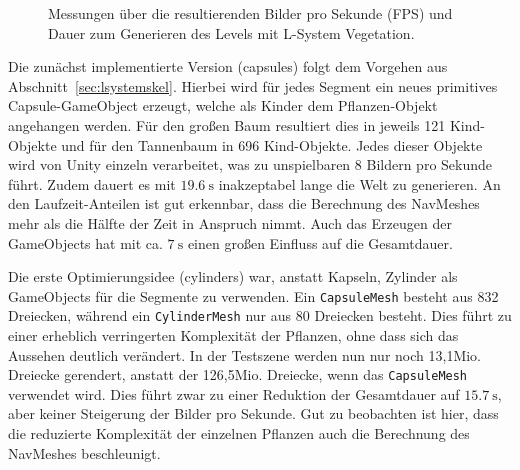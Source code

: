 \begin{figure}[ht]
    \caption[Messung von Vegetationsoptimierungen]{Messungen über die resultierenden Bilder pro Sekunde (FPS) und Dauer zum Generieren des Levels mit L-System Vegetation.}\label{fig:WG::Vegetation}
\end{figure}

Die zunächst implementierte Version (capsules) folgt dem Vorgehen aus Abschnitt~\ref{sec:lsystemskel}.
Hierbei wird für jedes Segment ein neues primitives Capsule-GameObject erzeugt, welche als Kinder dem Pflanzen-Objekt angehangen werden.
Für den großen Baum resultiert dies in jeweils 121 Kind-Objekte und für den Tannenbaum in 696 Kind-Objekte.
Jedes dieser Objekte wird von Unity einzeln verarbeitet, was zu unspielbaren 8 Bildern pro Sekunde führt.
Zudem dauert es mit $\SI{19.6}{\second}$ inakzeptabel lange die Welt zu generieren.
An den Laufzeit-Anteilen ist gut erkennbar, dass die Berechnung des NavMeshes mehr als die Hälfte der Zeit in Anspruch nimmt.
Auch das Erzeugen der GameObjects hat mit ca. $\SI{7}{\second}$ einen großen Einfluss auf die Gesamtdauer.

Die erste Optimierungsidee (cylinders) war, anstatt Kapseln, Zylinder als GameObjects für die Segmente zu verwenden.
Ein \texttt{CapsuleMesh} besteht aus 832 Dreiecken, während ein \texttt{CylinderMesh} nur aus 80 Dreiecken besteht.
Dies führt zu einer erheblich verringerten Komplexität der Pflanzen, ohne dass sich das Aussehen deutlich verändert.
In der Testszene werden nun nur noch 13,1Mio. Dreiecke gerendert, anstatt der 126,5Mio. Dreiecke, wenn das \texttt{CapsuleMesh} verwendet wird.
Dies führt zwar zu einer Reduktion der Gesamtdauer auf $\SI{15.7}{\second}$, aber keiner Steigerung der Bilder pro Sekunde.
Gut zu beobachten ist hier, dass die reduzierte Komplexität der einzelnen Pflanzen auch die Berechnung des NavMeshes beschleunigt.

